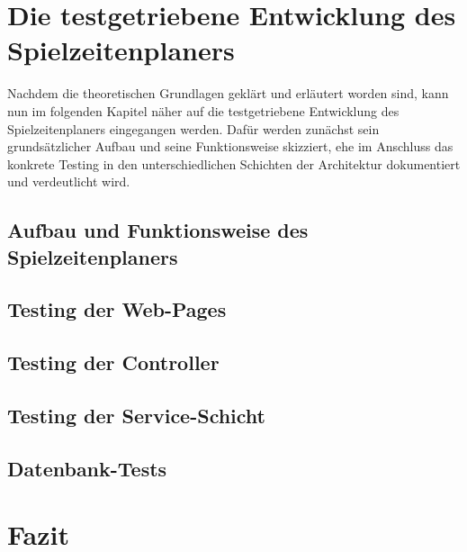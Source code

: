 


\section{Die testgetriebene Entwicklung des Spielzeitenplaners}

Nachdem die theoretischen Grundlagen geklärt und erläutert worden sind, kann nun 
im folgenden Kapitel näher auf die testgetriebene Entwicklung des 
Spielzeitenplaners eingegangen werden. Dafür werden zunächst sein grundsätzlicher 
Aufbau und seine Funktionsweise skizziert, ehe im Anschluss das konkrete Testing 
in den unterschiedlichen Schichten der Architektur dokumentiert und verdeutlicht 
wird. 


\subsection{Aufbau und Funktionsweise des Spielzeitenplaners}




\subsection{Testing der Web-Pages}




\subsection{Testing der Controller}




\subsection{Testing der Service-Schicht}




\subsection{Datenbank-Tests}




\section{Fazit}



